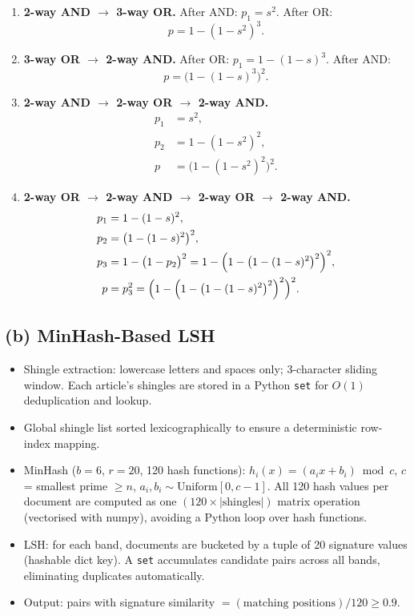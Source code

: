 \documentclass[11pt,a4paper]{article}
\begin{document}
\begin{enumerate}
  \item[(a)] \textbf{2-way AND $\to$ 3-way OR.}
        After AND: $p_1 = s^2$.
        After OR:
        \[ p = 1 - (1 - s^2)^3. \]

  \item[(b)] \textbf{3-way OR $\to$ 2-way AND.}
        After OR: $p_1 = 1-(1-s)^3$.
        After AND:
        \[ p = \bigl(1-(1-s)^3\bigr)^2. \]

  \item[(c)] \textbf{2-way AND $\to$ 2-way OR $\to$ 2-way AND.}
        \begin{align*}
          p_1 &= s^2, \\
          p_2 &= 1-(1-s^2)^2, \\
          p   &= \bigl(1-(1-s^2)^2\bigr)^2.
        \end{align*}

  \item[(d)] \textbf{2-way OR $\to$ 2-way AND $\to$ 2-way OR $\to$ 2-way AND.}
        \begin{align*}
          p_1 &= 1-(1-s)^2, \\
          p_2 &= \bigl(1-(1-s)^2\bigr)^2, \\
          p_3 &= 1-\bigl(1-p_2\bigr)^2
               = 1-\Bigl(1-\bigl(1-(1-s)^2\bigr)^2\Bigr)^2, \\
          p   &= p_3^2
               = \Bigl(1-\Bigl(1-\bigl(1-(1-s)^2\bigr)^2\Bigr)^2\Bigr)^2.
        \end{align*}
\end{enumerate}

\subsection*{(b) MinHash-Based LSH}

\begin{itemize}
  \item Shingle extraction: lowercase letters and spaces only; 3-character sliding window.
        Each article's shingles are stored in a Python \texttt{set} for $O(1)$ deduplication and lookup.

  \item Global shingle list sorted lexicographically to ensure a deterministic row-index mapping.

  \item MinHash ($b=6$, $r=20$, 120 hash functions): $h_i(x)=(a_i x+b_i)\bmod c$,
        $c$ = smallest prime $\ge n$, $a_i,b_i \sim \mathrm{Uniform}[0,c-1]$.
        All 120 hash values per document are computed as one $(120\times|\text{shingles}|)$
        matrix operation (vectorised with numpy), avoiding a Python loop over hash functions.

  \item LSH: for each band, documents are bucketed by a tuple of 20 signature values
        (hashable dict key). A \texttt{set} accumulates candidate pairs across all bands,
        eliminating duplicates automatically.

  \item Output: pairs with signature similarity $= (\text{matching positions})/120 \ge 0.9$.
\end{itemize}
\end{document}
